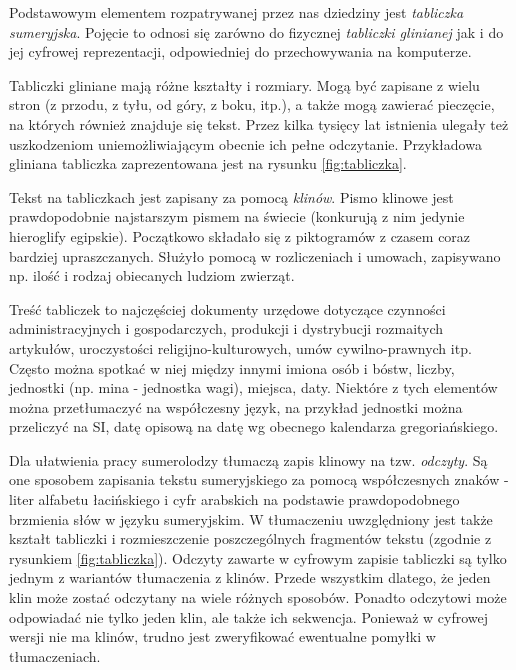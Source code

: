 Podstawowym elementem rozpatrywanej przez nas dziedziny jest \emph{tabliczka sumeryjska}. 
Pojęcie to odnosi się zarówno do fizycznej \emph{tabliczki glinianej} jak i do jej cyfrowej reprezentacji, 
odpowiedniej do przechowywania na komputerze. 

Tabliczki gliniane mają różne kształty i rozmiary. 
Mogą być zapisane z wielu stron (z przodu, z tyłu, od góry, z boku, itp.), a także mogą zawierać pieczęcie, 
na których również znajduje się tekst. Przez kilka tysięcy lat istnienia ulegały też uszkodzeniom uniemożliwiającym 
obecnie ich pełne odczytanie.
Przykładowa gliniana tabliczka zaprezentowana jest na rysunku \ref{fig:tabliczka}.

Tekst na tabliczkach jest zapisany za pomocą \emph{klinów}. Pismo klinowe jest prawdopodobnie najstarszym pismem na świecie 
(konkurują z nim jedynie hieroglify egipskie). Początkowo składało się z piktogramów z czasem coraz bardziej upraszczanych.
Służyło pomocą w rozliczeniach i umowach, zapisywano np. ilość i rodzaj obiecanych ludziom zwierząt.

Treść tabliczek to najczęściej dokumenty urzędowe dotyczące czynności administracyjnych i gospodarczych, 
produkcji i dystrybucji rozmaitych artykułów, uroczystości religijno-kulturowych, umów cywilno-prawnych itp. \cite{powalka}
Często można spotkać w niej między innymi imiona osób i bóstw, liczby, jednostki (np. mina - jednostka wagi), %
miejsca, daty. Niektóre z tych elementów można przetłumaczyć na współczesny język, na przykład jednostki można przeliczyć na SI, 
datę opisową na datę wg obecnego kalendarza gregoriańskiego. 

Dla ułatwienia pracy sumerolodzy tłumaczą zapis klinowy na tzw. \emph{odczyty}. 
Są one sposobem zapisania tekstu sumeryjskiego za pomocą współczesnych znaków - liter alfabetu łacińskiego i cyfr arabskich 
na podstawie prawdopodobnego brzmienia słów w języku sumeryjskim. 
W tłumaczeniu uwzględniony jest także kształt tabliczki i rozmieszczenie poszczególnych fragmentów tekstu 
(zgodnie z rysunkiem \ref{fig:tabliczka}). 
% 
Odczyty zawarte w cyfrowym zapisie tabliczki są tylko jednym z wariantów tłumaczenia z klinów. 
Przede wszystkim dlatego, że jeden klin może zostać odczytany na wiele różnych sposobów. 
Ponadto odczytowi może odpowiadać nie tylko jeden klin, ale także ich sekwencja. 
Ponieważ w cyfrowej wersji nie ma klinów, trudno jest zweryfikować ewentualne pomyłki w tłumaczeniach.

